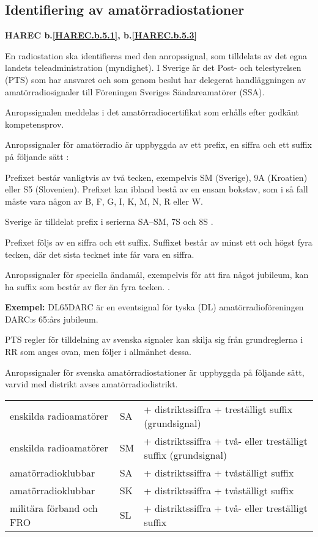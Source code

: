 \subsection{Identifiering av amatörradiostationer}
\textbf{
HAREC b.\ref{HAREC.b.5.1}\label{myHAREC.b.5.1},
 b.\ref{HAREC.b.5.3}\label{myHAREC.b.5.3}
}

En radiostation ska identifieras med den anropssignal, som tilldelats av det
egna landets teleadministration (myndighet).
I Sverige är det Post- och telestyrelsen (PTS) som har ansvaret och som genom
beslut har delegerat handläggningen av amatörradiosignaler till Föreningen
Sveriges Sändareamatörer (SSA).

Anropssignalen meddelas i det amatörradiocertifikat som erhålls efter godkänt
kompetensprov.

Anropssignaler för amatörradio är uppbyggda av ett prefix, en siffra och ett suffix på följande sätt
\cite[\S19.68, \S19.69]{ITU-RR}:

Prefixet består vanligtvis av två tecken, exempelvis SM (Sverige), 9A (Kroatien) eller S5 (Slovenien). Prefixet kan ibland bestå av en ensam bokstav, som i så fall måste vara någon av B, F, G, I, K, M, N, R eller W.

Sverige är tilldelat prefix i serierna SA--SM, 7S och 8S \cite[Appendix 42]{ITU-RR}.

Prefixet följs av en siffra och ett suffix. Suffixet består av minst ett och högst fyra tecken, där det sista tecknet inte får vara en siffra.

Anropssignaler för speciella ändamål, exempelvis för att fira något jubileum, kan ha suffix som består av fler än fyra tecken. \cite[\S19.68A]{ITU-RR}.

\textbf{Exempel:} DL65DARC är en eventsignal för tyska (DL)
amatörradioföreningen DARC:s 65:års jubileum.

PTS regler för tilldelning av svenska signaler kan skilja sig från grundreglerna
i RR som anges ovan, men följer i allmänhet dessa.

Anropssignaler för svenska amatörradiostationer är uppbyggda på följande
sätt, varvid med distrikt avses amatörradiodistrikt.

\begin{tabular}{lll}
enskilda radioamatörer & SA & + distriktssiffra + treställigt suffix (grundsignal) \\
enskilda radioamatörer & SM & + distriktssiffra + två- eller treställigt suffix (grundsignal) \\
amatörradioklubbar & SA & + distriktssiffra + tvåställigt suffix \\
amatörradioklubbar & SK & + distriktssiffra + tvåställigt suffix \\
militära förband och FRO & SL & + distriktssiffra + två- eller treställigt suffix \\
\end{tabular}

